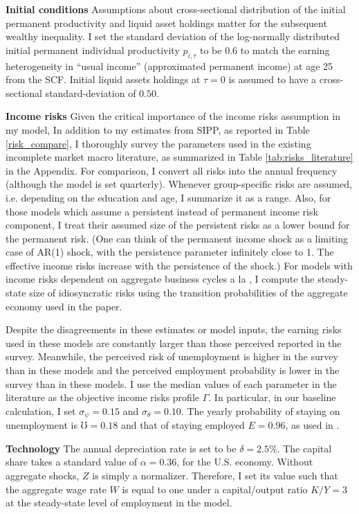 \textbf{Initial conditions} Assumptions about cross-sectional distribution of the initial permanent productivity and liquid asset holdings matter for the subsequent wealthy inequality. I set the standard deviation of the log-normally distributed initial permanent individual productivity $p_{i,\tau}$ to be $0.6$ to match the earning heterogeneity in ``usual income'' (approximated permanent income) at age 25 from the SCF. Initial liquid assets holdings at $\tau=0$ is assumed to have a cross-sectional standard-deviation of $0.50$. %

\textbf{Income risks} Given the critical importance of the income risks assumption in my model, In addition to my estimates from SIPP, as reported in Table \ref{risk_compare}, I thoroughly survey the parameters used in the existing incomplete market macro literature, as summarized in Table \ref{tab:risks_literature} in the Appendix. For comparison, I convert all risks into the annual frequency (although the model is set quarterly). Whenever group-specific risks are assumed, i.e. depending on the education and age, I summarize it as a range. Also, for those models which assume a persistent instead of permanent income risk component, I treat their assumed size of the persistent risks as a lower bound for the permanent risk. (One can think of the permanent income shock as a limiting case of AR(1) shock, with the persistence parameter infinitely close to 1. The effective income risks increase with the persistence of the shock.)  For models with income risks dependent on aggregate business cycles a la \cite{krusell1998income}, I compute the steady-state size of idiosyncratic risks using the transition probabilities of the aggregate economy used in the paper.  

Despite the disagreements in these estimates or model inputs, the earning risks used in these models are constantly larger than those perceived reported in the survey. Meanwhile, the perceived risk of unemployment is higher in the survey than in these models and the perceived employment probability is lower in the survey than in these models. I use the median values of each parameter in the literature as the objective income risks profile $\Gamma$. In particular, in our baseline calculation, I set $\sigma_\psi = 0.15$ and $\sigma_\theta = 0.10$. The yearly probability of staying on unemployment is $\mho = 0.18$ and that of staying employed $E = 0.96$, as used in \cite{krueger2016macroeconomics}. 

\textbf{Technology} %
The annual depreciation rate is set to be $\delta =2.5\%$. The capital share takes a standard value of $\alpha = 0.36$, for the U.S. economy. Without aggregate shocks, $Z$ is simply a normalizer. Therefore, I set its value such that the aggregate wage rate $W$ is equal to one under a capital/output ratio $K/Y= 3$ at the steady-state level of employment in the model. 

